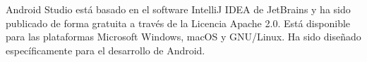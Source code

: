 \documentclass[conference]{IEEEtran}
\begin{document}
Android Studio está basado en el software IntelliJ IDEA de JetBrains y ha sido publicado de forma gratuita a través de la Licencia Apache 2.0. Está disponible para las plataformas Microsoft Windows, macOS y GNU/Linux. Ha sido diseñado específicamente para el desarrollo de Android.\cite{5}



\end{document}
